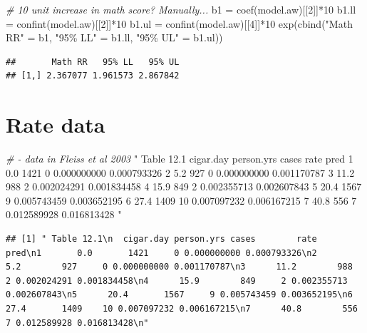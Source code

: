 \documentclass[
]{book}
\makeatletter
\newenvironment{Shaded}{\begin{snugshade}}{\end{snugshade}}
\newcommand{\CommentTok}[1]{\textcolor[rgb]{0.37,0.37,0.37}{\textit{#1}}}
\newcommand{\DecValTok}[1]{\textcolor[rgb]{0.06,0.06,0.06}{#1}}
\newcommand{\FunctionTok}[1]{\textcolor[rgb]{0,0,0}{#1}}
\newcommand{\NormalTok}[1]{#1}
\newcommand{\OtherTok}[1]{\textcolor[rgb]{0.37,0.37,0.37}{#1}}
\newcommand{\SpecialCharTok}[1]{\textcolor[rgb]{0,0,0}{#1}}
\newcommand{\StringTok}[1]{\textcolor[rgb]{0.5,0.5,0.5}{#1}}
\newenvironment{kframe}{%
\medskip{}
\setlength{\fboxsep}{.8em}
 \def\at@end@of@kframe{}%
 \ifinner\ifhmode%
  \def\at@end@of@kframe{\end{minipage}}%
  \begin{minipage}{\columnwidth}%
 \fi\fi%
 \def\FrameCommand##1{\hskip\@totalleftmargin \hskip-\fboxsep
 \colorbox{shadecolor}{##1}\hskip-\fboxsep
     \hskip-\linewidth \hskip-\@totalleftmargin \hskip\columnwidth}%
 \MakeFramed {\advance\hsize-\width
   \@totalleftmargin\z@ \linewidth\hsize
   \@setminipage}}%
 {\par\unskip\endMakeFramed%
 \at@end@of@kframe}
\renewenvironment{Shaded}{\begin{kframe}}{\end{kframe}}
\makeatother
\begin{document}
\begin{Shaded}
\begin{Highlighting}[]
\CommentTok{\# 10 unit increase in math score? Manually...}
\NormalTok{b1 }\OtherTok{=} \FunctionTok{coef}\NormalTok{(model.aw)[[}\DecValTok{2}\NormalTok{]]}\SpecialCharTok{*}\DecValTok{10}
\NormalTok{b1.ll }\OtherTok{=} \FunctionTok{confint}\NormalTok{(model.aw)[[}\DecValTok{2}\NormalTok{]]}\SpecialCharTok{*}\DecValTok{10}
\NormalTok{b1.ul }\OtherTok{=} \FunctionTok{confint}\NormalTok{(model.aw)[[}\DecValTok{4}\NormalTok{]]}\SpecialCharTok{*}\DecValTok{10}
\FunctionTok{exp}\NormalTok{(}\FunctionTok{cbind}\NormalTok{(}\StringTok{"Math RR"} \OtherTok{=}\NormalTok{ b1, }\StringTok{"95\% LL"} \OtherTok{=}\NormalTok{ b1.ll, }\StringTok{"95\% UL"} \OtherTok{=}\NormalTok{ b1.ul))}
\end{Highlighting}
\end{Shaded}

\begin{verbatim}
##       Math RR   95% LL   95% UL
## [1,] 2.367077 1.961573 2.867842
\end{verbatim}

\hypertarget{rate-data}{%
\section{Rate data}\label{rate-data}}

\begin{Shaded}
\begin{Highlighting}[]
\CommentTok{\# {-} data in Fleiss et al 2003}
\StringTok{" Table 12.1}
\StringTok{  cigar.day person.yrs cases        rate        pred}
\StringTok{1       0.0       1421     0 0.000000000 0.000793326}
\StringTok{2       5.2        927     0 0.000000000 0.001170787}
\StringTok{3      11.2        988     2 0.002024291 0.001834458}
\StringTok{4      15.9        849     2 0.002355713 0.002607843}
\StringTok{5      20.4       1567     9 0.005743459 0.003652195}
\StringTok{6      27.4       1409    10 0.007097232 0.006167215}
\StringTok{7      40.8        556     7 0.012589928 0.016813428}
\StringTok{"}
\end{Highlighting}
\end{Shaded}

\begin{verbatim}
## [1] " Table 12.1\n  cigar.day person.yrs cases        rate        pred\n1       0.0       1421     0 0.000000000 0.000793326\n2       5.2        927     0 0.000000000 0.001170787\n3      11.2        988     2 0.002024291 0.001834458\n4      15.9        849     2 0.002355713 0.002607843\n5      20.4       1567     9 0.005743459 0.003652195\n6      27.4       1409    10 0.007097232 0.006167215\n7      40.8        556     7 0.012589928 0.016813428\n"
\end{verbatim}
\end{document}
